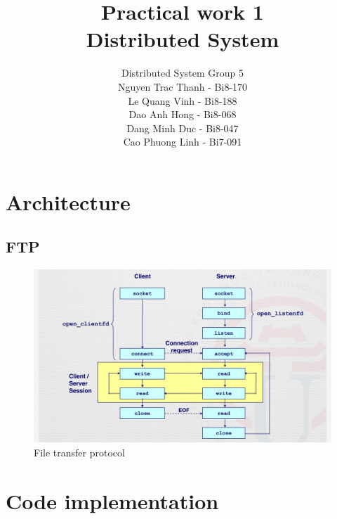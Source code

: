 \documentclass{article}
\begin{document}
\title{Practical work 1\protect\\ Distributed System}
\author{Distributed System Group 5\\ Nguyen Trac Thanh - Bi8-170\\ Le Quang Vinh - Bi8-188 \\ Dao Anh Hong - Bi8-068 \\ Dang Minh Duc - Bi8-047 \\ Cao Phuong Linh - Bi7-091} 

\maketitle
{}
\newpage
\tableofcontents

\newpage
\section{Architecture}
\subsection{FTP}
\begin{figure}
    \centering
    \includegraphics[height=\textheight, width=\textwidth,keepaspectratio]{Protocol.jpg}
    \caption{File transfer protocol}
\end{figure}




\newpage
\section{Code implementation}
\end{document}
